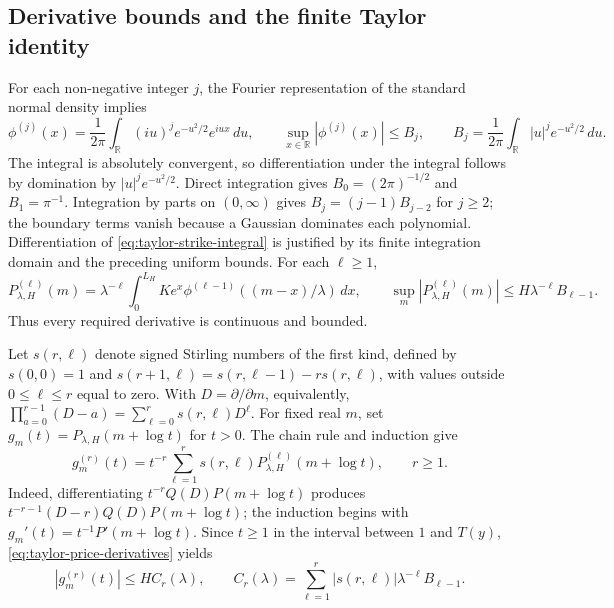 \subsection{Derivative bounds and the finite Taylor identity}
\label{sec:taylor-derivative-bound}

For each non-negative integer $j$, the Fourier representation of the standard normal density implies
\[
 \phi^{(j)}(x)=\frac1{2\pi}\int_{\mathbb R}(iu)^j e^{-u^2/2}e^{iux}\,du,
 \qquad
 \sup_{x\in\mathbb R}|\phi^{(j)}(x)|\leq B_j,
 \qquad
 B_j=\frac1{2\pi}\int_{\mathbb R}|u|^je^{-u^2/2}\,du.
\]
The integral is absolutely convergent, so differentiation under the integral follows by domination by $|u|^je^{-u^2/2}$. Direct integration gives $B_0=(2\pi)^{-1/2}$ and $B_1=\pi^{-1}$. Integration by parts on $(0,\infty)$ gives $B_j=(j-1)B_{j-2}$ for $j\geq2$; the boundary terms vanish because a Gaussian dominates each polynomial. Differentiation of \eqref{eq:taylor-strike-integral} is justified by its finite integration domain and the preceding uniform bounds. For each $\ell\geq1$,
\begin{equation}
 P_{\lambda,H}^{(\ell)}(m)
 =\lambda^{-\ell}\int_0^{L_H}K e^x\phi^{(\ell-1)}((m-x)/\lambda)\,dx,
 \qquad
 \sup_m|P_{\lambda,H}^{(\ell)}(m)|\leq H\lambda^{-\ell}B_{\ell-1}.
 \label{eq:taylor-price-derivatives}
\end{equation}
Thus every required derivative is continuous and bounded.

Let $s(r,\ell)$ denote signed Stirling numbers of the first kind, defined by $s(0,0)=1$ and $s(r+1,\ell)=s(r,\ell-1)-r s(r,\ell)$, with values outside $0\leq\ell\leq r$ equal to zero. With $D=\partial/\partial m$, equivalently, $\prod_{a=0}^{r-1}(D-a)=\sum_{\ell=0}^r s(r,\ell)D^\ell$. For fixed real $m$, set $g_m(t)=P_{\lambda,H}(m+\log t)$ for $t>0$. The chain rule and induction give
\begin{equation}
 g_m^{(r)}(t)
 =t^{-r}\sum_{\ell=1}^r s(r,\ell)P_{\lambda,H}^{(\ell)}(m+\log t),\qquad r\geq1.
 \label{eq:taylor-falling-derivatives}
\end{equation}
Indeed, differentiating $t^{-r}Q(D)P(m+\log t)$ produces $t^{-r-1}(D-r)Q(D)P(m+\log t)$; the induction begins with $g_m'(t)=t^{-1}P'(m+\log t)$. Since $t\geq1$ in the interval between $1$ and $T(y)$, \eqref{eq:taylor-price-derivatives} yields
\begin{equation}
 |g_m^{(r)}(t)|\leq H C_r(\lambda),\qquad
 C_r(\lambda)=\sum_{\ell=1}^r|s(r,\ell)|\lambda^{-\ell}B_{\ell-1}.
 \label{eq:taylor-uniform-constant}
\end{equation}

